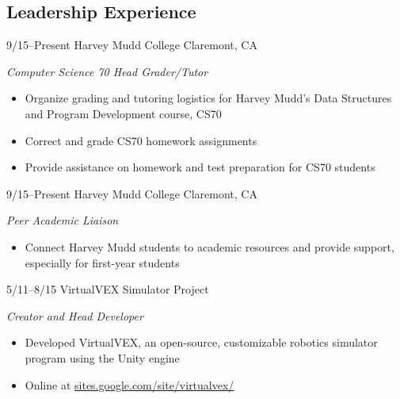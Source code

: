 \documentclass[print]{friggeri-cv} %
\begin{document}
\subsection{Leadership Experience}

\begin{entrylist}

\entry
{9/15--Present}
{Harvey Mudd College}
{Claremont, CA}
{\emph{Computer Science 70 Head Grader/Tutor}
\begin{itemize}
\item Organize grading and tutoring logistics for Harvey Mudd's Data Structures and Program Development course, CS70
\item Correct and grade CS70 homework assignments
\item Provide assistance on homework and test preparation for CS70 students
\end{itemize}}


\entry
{9/15--Present}
{Harvey Mudd College}
{Claremont, CA}
{\emph{Peer Academic Liaison}
\begin{itemize}
\item Connect Harvey Mudd students to academic resources and provide support, especially for first-year students
\end{itemize}}


\entry
{5/11--8/15}
{VirtualVEX Simulator Project}
{}
{\emph{Creator and Head Developer}
\begin{itemize}
\item Developed VirtualVEX, an open-source, customizable robotics simulator program using the Unity engine
\item Online at \href{https://sites.google.com/site/virtualvex/}{sites.google.com/site/virtualvex/}
\end{itemize}}

\end{entrylist}
\end{document}
